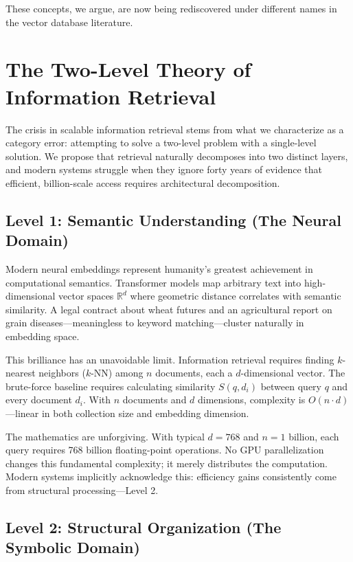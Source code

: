 \documentclass[manuscript,screen,nonacm]{acmart}
\begin{document}
These concepts, we argue, are now being rediscovered under different names in the vector database literature.

\section{The Two-Level Theory of Information Retrieval}

The crisis in scalable information retrieval stems from what we characterize as a category error: attempting to solve a two-level problem with a single-level solution. We propose that retrieval naturally decomposes into two distinct layers, and modern systems struggle when they ignore forty years of evidence that efficient, billion-scale access requires architectural decomposition.

\subsection{Level 1: Semantic Understanding (The Neural Domain)}

Modern neural embeddings represent humanity's greatest achievement in computational semantics. Transformer models map arbitrary text into high-dimensional vector spaces $\mathbb{R}^d$ where geometric distance correlates with semantic similarity. A legal contract about wheat futures and an agricultural report on grain diseases---meaningless to keyword matching---cluster naturally in embedding space.

This brilliance has an unavoidable limit. Information retrieval requires finding $k$-nearest neighbors ($k$-NN) among $n$ documents, each a $d$-dimensional vector. The brute-force baseline requires calculating similarity $S(q, d_i)$ between query $q$ and every document $d_i$. With $n$ documents and $d$ dimensions, complexity is $O(n \cdot d)$---linear in both collection size and embedding dimension.

The mathematics are unforgiving. With typical $d=768$ and $n=1$ billion, each query requires 768 billion floating-point operations. No GPU parallelization changes this fundamental complexity; it merely distributes the computation. Modern systems implicitly acknowledge this: efficiency gains consistently come from structural processing---Level 2.

\subsection{Level 2: Structural Organization (The Symbolic Domain)}
\end{document}
